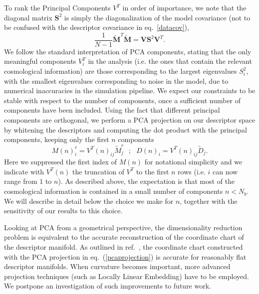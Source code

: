 \documentclass[reprint,aps,prd,superscriptaddress,showkeys,showpacs]{revtex4-1}
\begin{document}
To rank the Principal Components $V^T$ in order of importance, we note
that the diagonal matrix $\mathbf{S}^2$ is simply the diagonalization
of the model covariance (not to be confused with the descriptor
covariance in eq.~\ref{datacov}),
\begin{equation}
\frac{1}{N-1}\mathbf{\tilde{M}}^T\mathbf{\tilde{M}} = \mathbf{V}\mathbf{S}^2\mathbf{V}^T.
\end{equation} 
%
We follow the standard interpretation of PCA components, stating that
the only meaningful components $V^T_i$ in the analysis (i.e. the ones
that contain the relevant cosmological information) are those
corresponding to the largest eigenvalues $S^2_{i}$, with the smallest
eigenvalues corresponding to noise in the model, due to numerical
inaccuracies in the simulation pipeline. We expect our constraints to
be stable with respect to the number of components, once a sufficient
number of components have been included. Using the fact that different
principal components are orthogonal, we perform a PCA projection on
our descriptor space by whitening the descriptors and computing the
dot product with the principal components, keeping only the first $n$
components
\begin{equation}
\label{pcaprojection}
M(n)_{i}^r = V^T(n)_{ij}\tilde{M}_j^r \,\,\,\, ; \,\,\,\,  D(n)_i = V^T(n)_{ij}\tilde{D}_j.
\end{equation}
%
Here we suppressed the first index of $M(n)$ for notational simplicity
and we indicate with $V^T(n)$ the truncation of $V^T$ to the first $n$
rows (i.e. $i$ can now range from $1$ to $n$). As described above, the
expectation is that most of the cosmological information is contained
in a small number of components $n<N_{b}$. We will describe in detail
below the choice we make for $n$, together with the sensitivity of our
results to this choice.

Looking at PCA from a geometrical perspective, the dimensionality
reduction problem is equivalent to the accurate reconstruction of the
coordinate chart of the descriptor manifold. As outlined in
ref.~\citep{astroMLText}, the coordinate chart constructed with the
PCA projection in eq.~(\ref{pcaprojection}) is accurate for reasonably
flat descriptor manifolds. When curvature becomes important, more
advanced projection techniques (such as Locally Linear Embedding) have
to be employed.  We postpone an investigation of such improvements to
future work.



\end{document}
